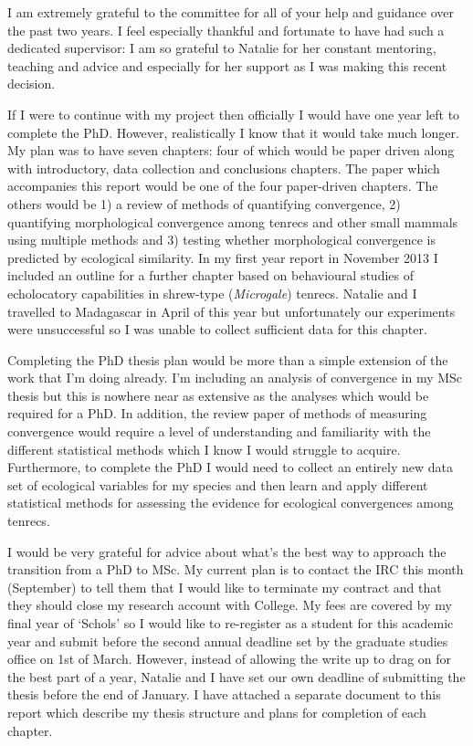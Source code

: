 \documentclass[12pt,a4paper]{article}
\begin{document}
	I am extremely grateful to the committee for all of your help and guidance over the past two years. I feel especially thankful and fortunate to have had such a dedicated supervisor: I am so grateful to Natalie for her constant mentoring, teaching and advice and especially for her support as I was making this recent decision.  %
	
	If I were to continue with my project then officially I would have one year left to complete the PhD. However, realistically I know that it would take much longer. My plan was to have seven chapters: four of which would be paper driven along with introductory, data collection and conclusions chapters. The paper which accompanies this report would be one of the four paper-driven chapters. The others would be 1) a review of methods of quantifying convergence, 
	2) quantifying morphological convergence among tenrecs and other small mammals using multiple methods and 3) testing whether morphological convergence is predicted by ecological similarity.
    In my first year report in November 2013 I included an outline for a further chapter based on behavioural studies of echolocatory capabilities in shrew-type (\textit{Microgale}) tenrecs. Natalie and I travelled to Madagascar in April of this year but unfortunately our experiments were unsuccessful so I was unable to collect sufficient data for this chapter.
	
	Completing the PhD thesis plan would be more than a simple extension of the work that I'm doing already. I'm including an analysis of convergence in my MSc thesis but this is nowhere near as extensive as the analyses which would be required for a PhD. In addition, the review paper of methods of measuring convergence would require a level of understanding and familiarity with the different statistical methods which I know I would struggle to acquire. Furthermore, to complete the PhD I would need to collect an entirely new data set of ecological variables for my species and then learn and apply different statistical methods for assessing the evidence for ecological convergences among tenrecs.

	I would be very grateful for advice about what's the best way to approach the transition from a PhD to MSc. My current plan is to contact the IRC this month (September) to tell them that I would like to terminate my contract and that they should close my research account with College. My fees are covered by my final year of `Schols' so I would like to re-register as a student for this academic year and submit before the second annual deadline set by the graduate studies office on 1st of March. However, instead of allowing the write up to drag on for the best part of a year, Natalie and I have set our own deadline of submitting the thesis before the end of January. I have attached a separate document to this report which describe my thesis structure and plans for completion of each chapter.
 
\end{document}
